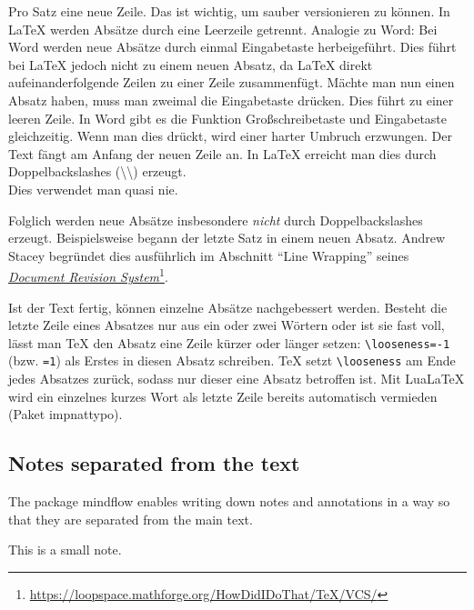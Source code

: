 \begin{ltgexample}
Pro Satz eine neue Zeile.
Das ist wichtig, um sauber versionieren zu können.
In LaTeX werden Absätze durch eine Leerzeile getrennt.
Analogie zu Word: Bei Word werden neue Absätze durch einmal Eingabetaste herbeigeführt.
Dies führt bei LaTeX jedoch nicht zu einem neuen Absatz, da LaTeX direkt aufeinanderfolgende Zeilen zu einer Zeile zusammenfügt.
Mächte man nun einen Absatz haben, muss man zweimal die Eingabetaste drücken.
Dies führt zu einer leeren Zeile.
In Word gibt es die Funktion Großschreibetaste und Eingabetaste gleichzeitig.
Wenn man dies drückt, wird einer harter Umbruch erzwungen.
Der Text fängt am Anfang der neuen Zeile an.
In LaTeX erreicht man dies durch Doppelbackslashes (\textbackslash\textbackslash) erzeugt.
\\
Dies verwendet man quasi nie.

Folglich werden neue Absätze insbesondere \emph{nicht} durch Doppelbackslashes erzeugt.
Beispielsweise begann der letzte Satz in einem neuen Absatz.
Andrew Stacey begründet dies ausführlich im Abschnitt \enquote{Line Wrapping} seines \href{https://loopspace.mathforge.org/HowDidIDoThat/TeX/VCS/#section.3}{\emph{Document Revision System}}\footnote{\url{https://loopspace.mathforge.org/HowDidIDoThat/TeX/VCS/}}.
\end{ltgexample}

Ist der Text fertig, können einzelne Absätze nachgebessert werden.
Besteht die letzte Zeile eines Absatzes nur aus ein oder zwei Wörtern oder ist sie fast voll, lässt man TeX den Absatz eine Zeile kürzer oder länger setzen: \texttt{\textbackslash looseness=-1} (bzw. \texttt{=1}) als Erstes in diesen Absatz schreiben.
TeX setzt \texttt{\textbackslash looseness} am Ende jedes Absatzes zurück, sodass nur dieser eine Absatz betroffen ist.
Mit LuaLaTeX wird ein einzelnes kurzes Wort als letzte Zeile bereits automatisch vermieden (Paket impnattypo).


\subsection{Notes separated from the text}

The package mindflow enables writing down notes and annotations in a way so that they are separated from the main text.

\begin{ltgexample}
\begin{mindflow}
This is a small note.
\end{mindflow}
\end{ltgexample}

